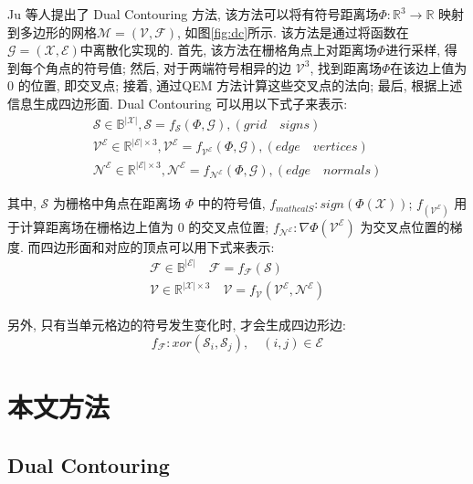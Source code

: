 Ju 等人\cite{ju2002dual}提出了 Dual Contouring 方法, 该方法可以将有符号距离场$\Phi:\mathbb{R}^3\rightarrow \mathbb{R}$ 映射到多边形的网格$\mathcal{M=(V,F)}$, 如图\ref{fig:dc}所示. 
该方法是通过将函数在$\mathcal{G=(X,E)}$中离散化实现的. 
首先, 该方法在栅格角点上对距离场$\Phi$进行采样, 得到每个角点的符号值; 
然后, 对于两端符号相异的边 $\mathcal{V}^3$, 找到距离场$\Phi$在该边上值为 0 的位置, 即交叉点; 
接着, 通过QEM 方法计算这些交叉点的法向; 
最后, 根据上述信息生成四边形面. Dual Contouring 可以用以下式子来表示: 
\begin{align}\label{a}
    \mathcal{S}\in \mathbb{B}^{|\mathcal{X}|},  \mathcal{S}=f_{\mathcal{S}}(\Phi,\mathcal{G}),  (grid \quad signs) \\
    \mathcal{V}^\mathcal{E}\in\mathbb{R}^{|\mathcal{E}|\times 3}, \mathcal{V}^\mathcal{E}=f_{\mathcal{V}^\mathcal{E}}(\Phi,\mathcal{G}), (edge\quad vertices)\\
    \mathcal{N}^\mathcal{E}\in\mathbb{R}^{|\mathcal{E}|\times 3},
    \mathcal{N}^\mathcal{E}=f_{\mathcal{N}^\mathcal{E}}(\Phi,\mathcal{G}), (edge\quad normals)
\end{align}

其中, $\mathcal{S}$ 为栅格中角点在距离场 $\Phi$ 中的符号值, $f_{mathcal{S}}: sign(\Phi(\mathcal{X}))$; $f_(\mathcal{V}^\mathcal{E})$ 用于计算距离场在栅格边上值为 0 的交叉点位置; 
$f_\mathcal{N^E}:\nabla \Phi(\mathcal{V^E})$ 为交叉点位置的梯度. 
而四边形面和对应的顶点可以用下式来表示: 
\begin{align}
    \mathcal{F}\in \mathbb{B}^{|\mathcal{E}|} \quad \mathcal{F}=f_{\mathcal{F}}(\mathcal{S}) \\
    \mathcal{V} \in \mathbb{R}^{|\mathcal{X}| \times 3} \quad \mathcal{V}=f_{\mathcal{V}}(\mathcal{V}^{\mathcal{E}}, \mathcal{N}^{\mathcal{E}})
\end{align}

另外, 只有当单元格边的符号发生变化时, 才会生成四边形边: 
\begin{equation}
    f_{\mathcal{F}}:xor(\mathcal{S}_i, \mathcal{S}_j), \quad (i, j)\in \mathcal{E}
\end{equation}

\section{本文方法}

\subsection{Dual Contouring}

